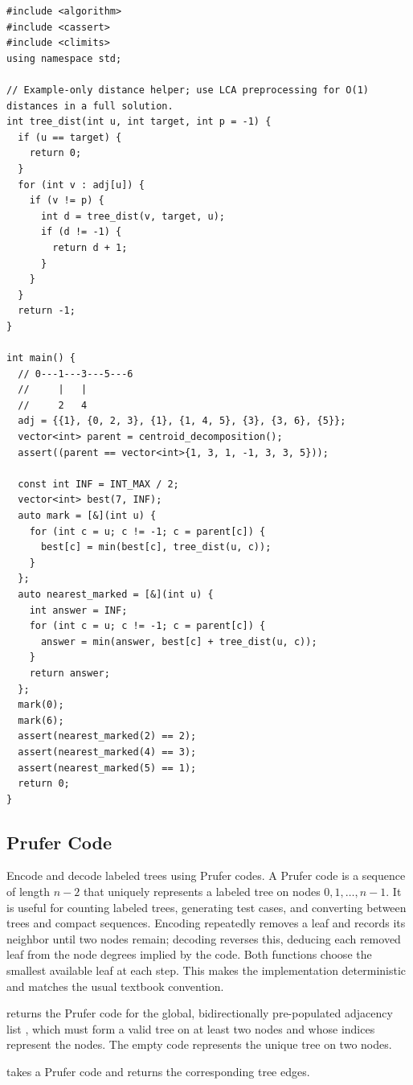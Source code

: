 \begin{lstlisting}[style=cpp]
#include <algorithm>
#include <cassert>
#include <climits>
using namespace std;

// Example-only distance helper; use LCA preprocessing for O(1) distances in a full solution.
int tree_dist(int u, int target, int p = -1) {
  if (u == target) {
    return 0;
  }
  for (int v : adj[u]) {
    if (v != p) {
      int d = tree_dist(v, target, u);
      if (d != -1) {
        return d + 1;
      }
    }
  }
  return -1;
}

int main() {
  // 0---1---3---5---6
  //     |   |
  //     2   4
  adj = {{1}, {0, 2, 3}, {1}, {1, 4, 5}, {3}, {3, 6}, {5}};
  vector<int> parent = centroid_decomposition();
  assert((parent == vector<int>{1, 3, 1, -1, 3, 3, 5}));

  const int INF = INT_MAX / 2;
  vector<int> best(7, INF);
  auto mark = [&](int u) {
    for (int c = u; c != -1; c = parent[c]) {
      best[c] = min(best[c], tree_dist(u, c));
    }
  };
  auto nearest_marked = [&](int u) {
    int answer = INF;
    for (int c = u; c != -1; c = parent[c]) {
      answer = min(answer, best[c] + tree_dist(u, c));
    }
    return answer;
  };
  mark(0);
  mark(6);
  assert(nearest_marked(2) == 2);
  assert(nearest_marked(4) == 3);
  assert(nearest_marked(5) == 1);
  return 0;
}
\end{lstlisting}
\subsection{Prufer Code}
\label{sec:4.1.8}
Encode and decode labeled trees using Prufer codes. A Prufer code is a sequence of length $n - 2$ that uniquely represents a labeled tree on nodes $0, 1, \ldots, n - 1$. It is useful for counting labeled trees, generating test cases, and converting between trees and compact sequences. Encoding repeatedly removes a leaf and records its neighbor until two nodes remain; decoding reverses this, deducing each removed leaf from the node degrees implied by the code. Both functions choose the smallest available leaf at each step. This makes the implementation deterministic and matches the usual textbook convention.

\begin{compactitem}
  \item {} returns the Prufer code for the global, bidirectionally pre-populated adjacency list , which must form a valid tree on at least two nodes and whose indices represent the nodes. The empty code represents the unique tree on two nodes.
  \item {} takes a Prufer code and returns the corresponding tree edges.
\end{compactitem}

